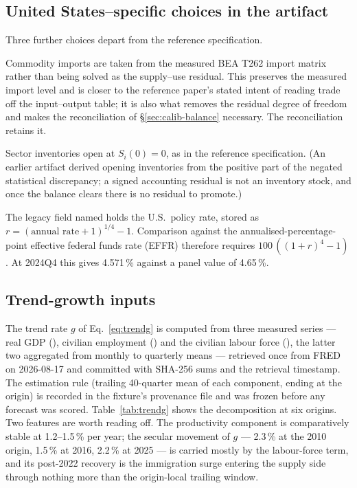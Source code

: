 \documentclass[11pt,a4paper]{article}
\newcommand{\code}[1]{\texttt{\detokenize{#1}}}
\begin{document}
\subsection{United States--specific choices in the artifact}

Three further choices depart from the reference specification.

\begin{description}[leftmargin=1.4em,style=nextline,itemsep=3pt]
\item[Explicit measured trade (\code{use_explicit_trade = true}).] Commodity imports are taken
  from the measured BEA T262 import matrix rather than being solved as the supply--use residual.
  This preserves the measured import level and is closer to the reference paper's stated intent of
  reading trade off the input--output table; it is also what removes the residual degree of
  freedom and makes the reconciliation of \S\ref{sec:calib-balance} necessary. The reconciliation
  retains it.
\item[Opening inventories are zero.] Sector inventories open at $S_i(0)=0$, as in the reference
  specification. (An earlier artifact derived opening inventories from the positive part of the
  negated statistical discrepancy; a signed accounting residual is not an inventory stock, and
  once the balance clears there is no residual to promote.)
\item[Policy rate on a quarterly basis.] The legacy field named \code{euribor} holds the U.S.\
  policy rate, stored as $r=(\text{annual rate}+1)^{1/4}-1$. Comparison against the
  annualised-percentage-point effective federal funds rate (EFFR) therefore requires
  $100\,((1+r)^4-1)$. At 2024Q4 this gives 4.571\,\% against a panel value of 4.65\,\%.
\end{description}

\subsection{Trend-growth inputs}
\label{sec:calib-trend}

The trend rate $g$ of Eq.~\eqref{eq:trendg} is computed from three measured series --- real GDP
(\code{GDPC1}), civilian employment (\code{CE16OV}) and the civilian labour force
(\code{CLF16OV}), the latter two aggregated from monthly to quarterly means --- retrieved once
from FRED on 2026-08-17 and committed with SHA-256 sums and the retrieval timestamp. The
estimation rule (trailing 40-quarter mean of each component, ending at the origin) is recorded in
the fixture's provenance file and was frozen before any forecast was scored.
Table~\ref{tab:trendg} shows the decomposition at six origins. Two features are worth reading
off. The productivity component is comparatively stable at 1.2--1.5\,\% per year; the secular
movement of $g$ --- 2.3\,\% at the 2010 origin, 1.5\,\% at 2016, 2.2\,\% at 2025 --- is carried
mostly by the labour-force term, and its post-2022 recovery is the immigration surge entering the
supply side through nothing more than the origin-local trailing window.
\end{document}
